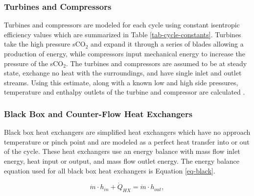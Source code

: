 \subsubsection{Turbines and Compressors }

Turbines and compressors are modeled for each cycle using constant isentropic efficiency values which are summarized in Table \ref{tab-cycle-constants}. Turbines take the high pressure sCO$_2$ and expand it through a series of blades allowing a production of energy, while compressors input mechanical energy to increase the pressure of the sCO$_2$. The turbines and compressors are assumed to be at steady state, exchange no heat with the surroundings, and have single inlet and outlet streams. Using this estimate, along with a known low and high side pressures, temperature and enthalpy outlets of the turbine and compressor are calculated \cite{klein_nellis_2011}. 


\subsubsection{Black Box and Counter-Flow Heat Exchangers}

Black box heat exchangers are simplified heat exchangers which have no approach temperature or pinch point and are modeled as a perfect heat transfer into or out of the cycle. These heat exchangers use an energy balance with mass flow inlet energy, heat input or output, and mass flow outlet energy. The energy balance equation used for all black box heat exchangers is Equation \ref{eq-black}.



\begin{equation}
    \label{eq-black}
    \dot{m} \cdot h_{in} + \dot{Q}_{HX} = \dot{m} \cdot h_{out} ,
\end{equation}


